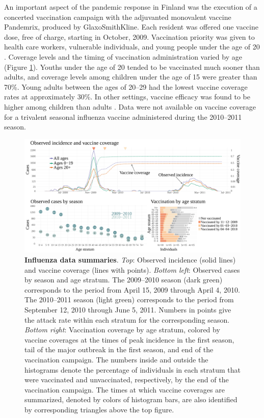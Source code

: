 An important aspect of the pandemic response in Finland was the execution of a concerted vaccination campaign with the adjuvanted monovalent vaccine Pandemrix, produced by GlaxoSmithKline. Each resident was offered one vaccine dose, free of charge, starting in October, 2009. Vaccination priority was given to health care workers, vulnerable individuals, and young people under the age of 20 \cite{syrjanen2014effectiveness}. Coverage levels and the timing of vaccination administration varied by age (Figure \ref{fig:finland_fludat_intro}).  Youths under the age of 20 tended to be vaccinated much sooner than adults, and coverage levels among children under the age of 15 were greater than 70\%. Young adults between the ages of 20--29 had the lowest vaccine coverage rates at approximately 30\%. In other settings, vaccine efficacy was found to be higher among children than adults \cite{lansbury2017effectiveness}. Data were not available on vaccine coverage for a trivalent seasonal influenza vaccine administered during the 2010--2011 season. 

\begin{figure}
	\centering
	\includegraphics[width=\linewidth]{figures/fludat_plots}
	\caption[A(H1N1)pdm09 incidence and vaccination data from Finland, April 15, 2009 --- June 5, 2011.]{\textbf{Influenza data summaries}. \textit{Top}: Observed incidence (solid lines) and vaccine coverage (lines with points). \textit{Bottom left}: Observed cases by season and age stratum. The 2009--2010 season (dark green) corresponds to the period from April 15, 2009 through April 4, 2010. The 2010--2011 season (light green) corresponds to the period from September 12, 2010 through June 5, 2011. Numbers in points give the attack rate within each stratum for the corresponding season. \textit{Bottom right}: Vaccination coverage by age stratum, colored by vaccine coverages at the times of peak incidence in the first season, tail of the major outbreak in the first season, and end of the vaccination campaign. The numbers inside and outside the histograms denote the percentage of individuals in each stratum that were vaccinated and unvaccinated, respectively, by the end of the vaccination campaign. The times at which vaccine coverages are summarized, denoted by colors of histogram bars, are also identified by corresponding triangles above the top figure.}
	\label{fig:finland_fludat_intro}
\end{figure}

